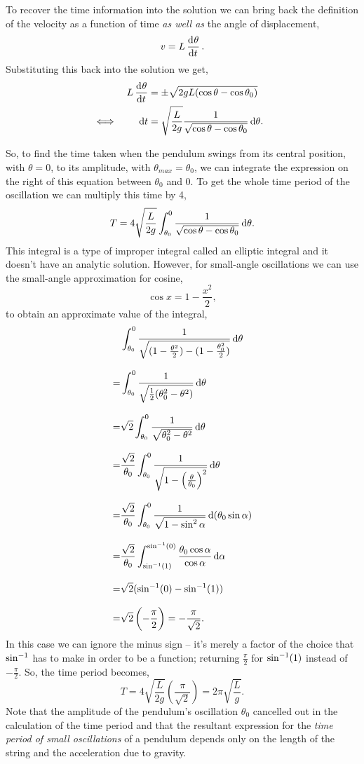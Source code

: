 \documentclass[../MathsNotesBase.tex]{subfiles}
\begin{document}
{\begin{exe}
{				To recover the time information into the solution we can bring back the definition of the velocity as a function of time \textit{as well as} the angle of displacement,
				\[ v = L\dod{\theta}{t}. \]
				Substituting this back into the solution we get,
				\begin{align*}
					&& L\dod{\theta}{t} &= \pm \sqrt{2gL (\cos\theta - \cos\theta_0)} \\
					&\iff & \dif t &= \sqrt{\frac{L}{2g}} \frac{1}{\sqrt{\cos\theta - \cos\theta_0}} \dif \theta. &\sidecomment{}
				\end{align*}
			
				So, to find the time taken when the pendulum swings from its central position, with ${ \theta = 0 }$, to its amplitude, with ${ \theta_{max} = \theta_0 }$, we can integrate the expression on the right of this equation between $\theta_0$ and 0. To get the whole time period of the oscillation we can multiply this time by 4,
				\[ T = 4 \sqrt{\frac{L}{2g}} \int_{\theta_0}^0 \frac{1}{\sqrt{\cos\theta - \cos\theta_0}}  \dif \theta. \]
				This integral is a type of improper integral called an elliptic integral and it doesn't have an analytic solution. However, for small-angle oscillations we can use the small-angle approximation for cosine, 
				\[ \cos{x} = 1 - \frac{x^2}{2}, \]
				to obtain an approximate value of the integral,
				\begin{align*}
					&\int_{\theta_0}^0 \frac{1}{\sqrt{(1 - \frac{\theta^2}{2}) - (1 - \frac{\theta_0^2}{2})}}  \dif \theta  \nnn
					= &\int_{\theta_0}^0 \frac{1}{\sqrt{\frac{1}{2}(\theta_0^2 - \theta^2)}}  \dif \theta  \nnn
					= &\sqrt{2} \int_{\theta_0}^0 \frac{1}{\sqrt{\theta_0^2 - \theta^2}}  \dif \theta  \nnn
					= &\frac{\sqrt{2}}{\theta_0} \int_{\theta_0}^0 \frac{1}{ \sqrt{ 1 - \left(\frac{\theta}{\theta_0}\right)^2 } }  \dif \theta  \nnn
					= &\frac{\sqrt{2}}{\theta_0} \int_{\theta_0}^0 \frac{1}{ \sqrt{ 1 - \sin^2\alpha } }  \dif\, (\theta_0\sin\alpha)  \\[9pt]
					= &\frac{\sqrt{2}}{\theta_0} \int_{\inv\sin(1)}^{\inv\sin(0)} \frac{\theta_0\cos\alpha}{\cos\alpha}  \dif \alpha  \\[9pt]
					= &\sqrt{2} (\inv\sin(0) - \inv\sin(1))  \nnn
					= &\sqrt{2} \left( - \frac{\pi}{2} \right) = - \frac{\pi}{\sqrt{2}}.  \\
				\end{align*}
				In this case we can ignore the minus sign -- it's merely a factor of the choice that ${\sin}^{-1}$ has to make in order to be a function; returning $\frac{\pi}{2}$ for ${\sin}^{-1}(1)$ instead of $- \frac{\pi}{2}$. So, the time period becomes,
				\[ T = 4 \sqrt{\frac{L}{2g}} \left( \frac{\pi}{\sqrt{2}} \right) = 2\pi \sqrt{\frac{L}{g}}. \]
				Note that the amplitude of the pendulum's oscillation $\theta_0$ cancelled out in the calculation of the time period and that the resultant expression for the \textit{time period of small oscillations} of a pendulum depends only on the length of the string and the acceleration due to gravity.
			}\label{ex:pendulum-first-order-exact}
		\end{exe}
		
}
\end{document}
